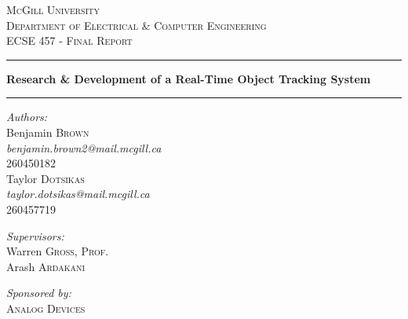 \documentclass[11pt]{article} %
\newcommand{\HRule}[1][\medskipamount]{\par
  \vspace*{\dimexpr-\parskip-\baselineskip+#1}
  \noindent\rule{\linewidth}{0.2mm}\par
  \vspace*{\dimexpr-\parskip-.5\baselineskip+#1}}
\begin{document}
\begin{titlepage}
\begin{center}
\textsc{\huge McGill University}\\[1.5cm]
\textsc{\LARGE Department of Electrical \& Computer Engineering}\\[1.5cm]
\textsc{\Large ECSE 457 - Final Report}\\[3cm]
\HRule
{\huge \bfseries Research \& Development of a Real-Time Object Tracking System \\[.3cm] }
\HRule 
\vspace{1.5cm}
\noindent
\begin{minipage}{0.4\textwidth}
\begin{flushleft} \large
\emph{\Large Authors:}\\
\vspace{.2cm}
Benjamin \textsc{Brown} \\
\textit{benjamin.brown2@mail.mcgill.ca} \\
260450182 \\
\vspace{.2cm}
Taylor \textsc{Dotsikas} \\
\textit{taylor.dotsikas@mail.mcgill.ca} \\
260457719
\end{flushleft}
\begin{flushleft} \large
\emph{\Large Supervisors:}\\
\vspace{.2cm}
Warren \textsc{Gross, Prof.}\\
\vspace{.2cm}
Arash \textsc{Ardakani} 
\end{flushleft}
\begin{flushleft} \large
\emph{\Large Sponsored by:}\\
\vspace{.2cm}
\textsc{Analog Devices}\\
\end{flushleft}
\end{minipage}%
\end{center}
\end{titlepage}
\pagebreak
\end{document}
